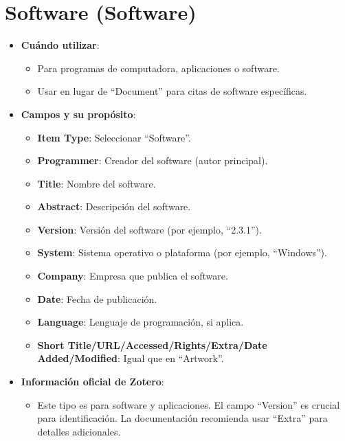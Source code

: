 \documentclass[
  jou,
  floatsintext,
  longtable,
  a4paper,
  nolmodern,
  notxfonts,
  notimes,
  12pt,
  colorlinks=true,linkcolor=blue,citecolor=blue,urlcolor=blue]{apa7}
\providecommand{\tightlist}{%
  \setlength{\itemsep}{0pt}\setlength{\parskip}{0pt}}
\begin{document}
\section{Software (Software)}\label{software-software}

\begin{itemize}
\tightlist
\item
  \textbf{Cuándo utilizar}:

  \begin{itemize}
  \tightlist
  \item
    Para programas de computadora, aplicaciones o software.
  \item
    Usar en lugar de ``Document'' para citas de software específicas.
  \end{itemize}
\item
  \textbf{Campos y su propósito}:

  \begin{itemize}
  \tightlist
  \item
    \textbf{Item Type}: Seleccionar ``Software''.
  \item
    \textbf{Programmer}: Creador del software (autor principal).
  \item
    \textbf{Title}: Nombre del software.
  \item
    \textbf{Abstract}: Descripción del software.
  \item
    \textbf{Version}: Versión del software (por ejemplo, ``2.3.1'').
  \item
    \textbf{System}: Sistema operativo o plataforma (por ejemplo,
    ``Windows'').
  \item
    \textbf{Company}: Empresa que publica el software.
  \item
    \textbf{Date}: Fecha de publicación.
  \item
    \textbf{Language}: Lenguaje de programación, si aplica.
  \item
    \textbf{Short Title/URL/Accessed/Rights/Extra/Date Added/Modified}:
    Igual que en ``Artwork''.
  \end{itemize}
\item
  \textbf{Información oficial de Zotero}:

  \begin{itemize}
  \tightlist
  \item
    Este tipo es para software y aplicaciones. El campo ``Version'' es
    crucial para identificación. La documentación recomienda usar
    ``Extra'' para detalles adicionales.
  \end{itemize}
\end{itemize}
\end{document}

